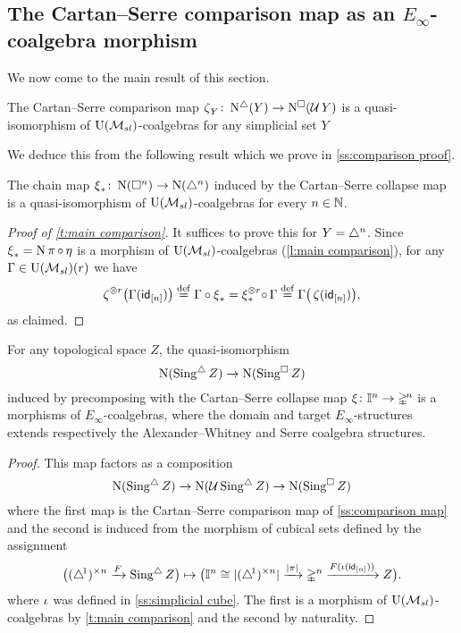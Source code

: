 \subsection{The Cartan--Serre comparison map as an $E_\infty$-coalgebra morphism} \label{ss:the cartan-serre chain map}

We now come to the main result of this section.

\begin{theorem} \label{t:main comparison}
	The Cartan--Serre comparison map $\operatorname{\zeta}_Y \colon \operatorname{N^{\triangle}}(Y) \to \operatorname{N^{\square}}(\operatorname{\mathcal{U}} Y)$ is a quasi-isomorphism of ${\operatorname{U}(\mathcal{M}_{sl})}$-coalgebras for any simplicial set $Y$
\end{theorem}

We deduce this from the following result which we prove in \cref{ss:comparison proof}.

\begin{lemma} \label{l:main comparison}
	The chain map $\operatorname{\xi}_\ast \colon \operatorname{N}(\square^n) \to \operatorname{N}(\triangle^n)$ induced by the Cartan--Serre collapse map is a quasi-isomorphism of ${\operatorname{U}(\mathcal{M}_{sl})}$-coalgebras for every $n \in \mathbb{N}$.
\end{lemma}

\begin{proof}[Proof of \cref{t:main comparison}]
	It suffices to prove this for $Y = \triangle^n$.
	Since $\operatorname{\xi}_\ast = \operatorname{N} \operatorname{\pi} \circ \operatorname{\eta}$ is a morphism of ${\operatorname{U}(\mathcal{M}_{sl})}$-coalgebras (\cref{l:main comparison}), for any $\Gamma \in {\operatorname{U}(\mathcal{M}_{sl})}(r)$ we have
	\begin{align*}
	\operatorname{\zeta}^{\otimes r} \! \big( \Gamma(\mathsf{id}_{[n]}) \big) \stackrel{\mathrm{def}}{=}
	\Gamma \circ \operatorname{\xi}_\ast =
	\operatorname{\xi}_\ast^{\otimes r} \! \circ \, \Gamma \stackrel{\mathrm{def}}{=}
	\Gamma \big( \operatorname{\zeta} (\mathsf{id}_{[n]}) \big),
	\end{align*}
	as claimed.
\end{proof}

\begin{corollary} \label{t:topological comparison}
	For any topological space $Z$, the quasi-isomorphism
	\[
	\operatorname{N}(\operatorname{Sing^{\triangle}} Z) \to \operatorname{N}(\operatorname{Sing^{\square}} Z)
	\]
	induced by precomposing with the Cartan--Serre collapse map $\operatorname{\xi} \colon \mathbb{I}^n \to \mathbb{\Delta}^{\!n}$ is a morphisms of $E_\infty$-coalgebras, where the domain and target $E_\infty$-structures extends respectively the Alexander--Whitney and Serre coalgebra structures.
\end{corollary}

\begin{proof}
	This map factors as a composition
	\[
	\operatorname{N}(\operatorname{Sing^{\triangle}} Z) \to \operatorname{N}(\operatorname{\mathcal{U}} \operatorname{Sing^{\triangle}} Z) \to \operatorname{N}(\operatorname{Sing^{\square}} Z)
	\]
	where the first map is the Cartan--Serre comparison map of \cref{ss:comparison map} and the second is induced from the morphism of cubical sets defined by the assignment
	\[
	\big( (\triangle^{\!1})^{\times n} \xrightarrow{F} \operatorname{Sing^{\triangle}} Z \big) \mapsto
	\big( \mathbb{I}^n \cong \lvert(\triangle^{\!1})^{\times n}\rvert \xrightarrow{\lvert\operatorname{\pi}\rvert} \mathbb{\Delta}^n \xrightarrow{F(\operatorname{\iota}(\mathsf{id}_{[n]}))} Z \big).
	\]
	where $\operatorname{\iota}$ was defined in \cref{ss:simplicial cube}.
	The first is a morphism of ${\operatorname{U}(\mathcal{M}_{sl})}$-coalgebras by \cref{t:main comparison} and the second by naturality.
\end{proof}


